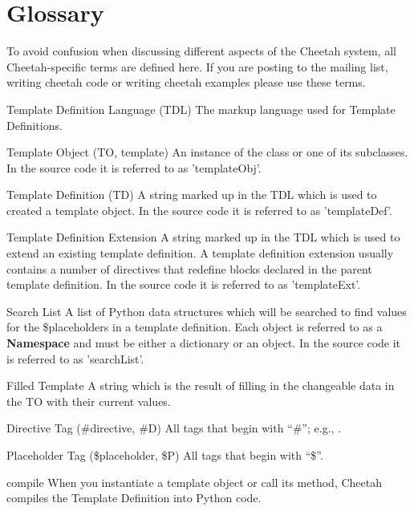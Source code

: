 \section{Glossary}
\label{glossary}

To avoid confusion when discussing different aspects of the Cheetah system, all
Cheetah-specific terms are defined here.  If you are posting to the mailing
list, writing cheetah code or writing cheetah examples please use these terms.

\begin{description}

\item{Template Definition Language (TDL)}  The markup language used for
     Template Definitions.
     
\item{Template Object (TO, template)} An instance of the class
      or one of its subclasses.  In the source
     code it is referred to as 'templateObj'.
     
\item{Template Definition (TD)} A string marked up in the TDL which is used to
     created a template object.  In the source code it is referred to as
     'templateDef'.
     
\item{Template Definition Extension} A string marked up in the TDL which is used
     to extend an existing template definition. A template definition extension
     usually contains a number of  directives that redefine blocks
     declared in the parent template definition. In the source code it is
     referred to as 'templateExt'.
     
\item{Search List} A list of Python data structures which will be searched to
     find values for the \$placeholders in a template definition.  Each object
     is referred to as a {\bf Namespace} and must be either a dictionary or an
     object. In the source code it is referred to as 'searchList'.

\item{Filled Template} A string which is the result of filling in the
     changeable data in the TO with their current values.

\item{Directive Tag (\#directive, \#D)}  All tags that begin with ``\#''; e.g.,
     .  

\item{Placeholder Tag (\$placeholder, \$P)}  All tags that begin with ``\$''.
     
\item{compile} When you instantiate a template object or call its
      method, Cheetah compiles the Template Definition
     into Python code.

\end{description}


